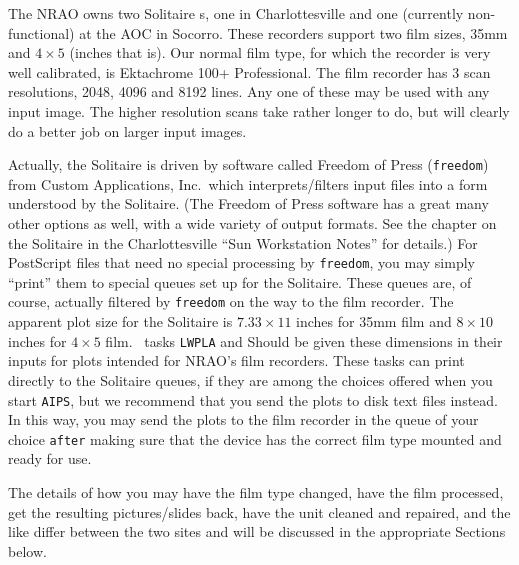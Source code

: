      The NRAO owns two Solitaire s, one in
Charlottesville and one (currently non-functional) at the AOC in
Socorro.  These recorders support two film sizes, 35mm and $4 \times
5$ (inches that is).  Our normal film type, for which the recorder is
very well calibrated, is Ektachrome 100+ Professional.  The film
recorder has 3 scan resolutions, 2048, 4096 and 8192 lines.  Any one
of these may be used with any input image.  The higher resolution
scans take rather longer to do, but will clearly do a better job on
larger input images.

     Actually, the Solitaire is driven by software called Freedom of
Press ({\tt freedom}) from Custom Applications, Inc.~which
interprets/filters  input files into a form
understood by the Solitaire.  (The Freedom of Press software has a
great many other options as well, with a wide variety of output
formats.  See the chapter on the Solitaire in the Charlottesville
``Sun Workstation Notes'' for details.)  For PostScript files that
need no special processing by {\tt freedom}, you may simply ``print''
them to special queues set up for the Solitaire.  These queues are, of
course, actually filtered by {\tt freedom} on the way to the film
recorder. The apparent plot size for the Solitaire is $7.33 \times 11$
inches for 35mm film and $8\times10$ inches for $4\times5$ film.
\AIPS\ tasks {\tt LWPLA} and {\tt {}} Should be given these
dimensions in their inputs for plots intended for NRAO's film
recorders.  These tasks can print directly to the Solitaire queues, if
they are among the choices offered when you start {\tt AIPS}, but we
recommend that you send the plots to disk text files instead.  In this
way, you may send the plots to the film recorder in the queue of your
choice {\tt after} making sure that the device has the correct film
type mounted and ready for use.

     The details of how you may have the film type changed, have the
film processed, get the resulting pictures/slides back, have the unit
cleaned and repaired, and the like differ between the two sites and
will be discussed in the appropriate Sections below.

